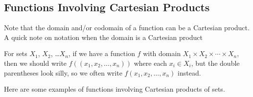 
\newcommand{\subfncartprod}{Functions Involving Cartesian Products}
\subsection{\subfncartprod}
\label{sub_fn_cart_prod}

Note that the domain and/or codomain of a function can be a Cartesian product.  A quick note on notation when the domain is a Cartesian product

\begin{rem}
\label{rem_fn_on_cart_prod}
    For sets $X_1$, $X_2$, \ldots $X_n$, if we have a function $f$ with domain $X_1 \times X_2 \times \cdots \times X_n$, then we should write $f((x_1,x_2, \ldots, x_n))$ where each $x_i \in X_i$, but the double parentheses look silly, so we often write $f(x_1,x_2, \ldots, x_n)$ instead.
\end{rem}

Here are some examples of functions involving Cartesian products of sets.

